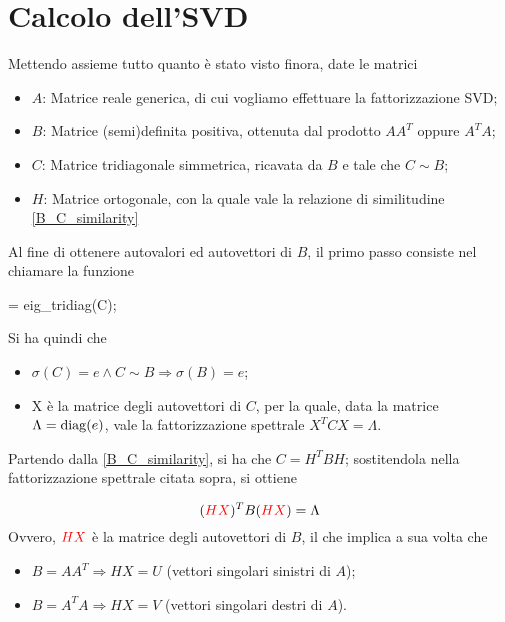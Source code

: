 \section{Calcolo dell'SVD}
Mettendo assieme tutto quanto è stato visto finora, date le matrici
\begin{itemize}
	\item $A$: Matrice reale generica, di cui vogliamo effettuare la 
fattorizzazione SVD;
	\item $B$: Matrice (semi)definita positiva, ottenuta dal prodotto $A A^T$ 
oppure $A^T A$;
	\item $C$: Matrice tridiagonale simmetrica, ricavata da $B$ e tale che $C \sim 
B$;
	\item $H$: Matrice ortogonale, con la quale vale la relazione di similitudine 
\eqref{B_C_similarity}
\end{itemize}

Al fine di ottenere autovalori ed autovettori di $B$, il primo passo consiste 
nel chiamare la funzione
\begin{programma}
[X,e] = eig_tridiag(C);
\end{programma}

 Si ha quindi che
 \begin{itemize}
 	\item $\sigma(C) = e \wedge C \sim B \Rightarrow \sigma(B) = e$;
 	\item X è la matrice degli autovettori di $C$, per la quale, data la matrice 
$\Lambda = \operatorname{diag}(e)$, vale la fattorizzazione spettrale $X^T C X = \Lambda$.
 \end{itemize}

Partendo dalla \eqref{B_C_similarity}, si ha che $C = H^T B H$; sostitendola 
nella fattorizzazione spettrale citata sopra, si ottiene 

 \begin{equation*}
	(\textcolor{red}{H X})^T B (\textcolor{red}{H X}) = \Lambda
\end{equation*}
Ovvero, $\textcolor{red}{H X}$ è la matrice degli autovettori di $B$, il che 
implica a sua volta che

\begin{itemize}
	\item $B = A A^T \Rightarrow H X = U$ (vettori singolari sinistri di $A$);
	\item $B = A^T A \Rightarrow H X = V$ (vettori singolari destri di $A$).
\end{itemize}


